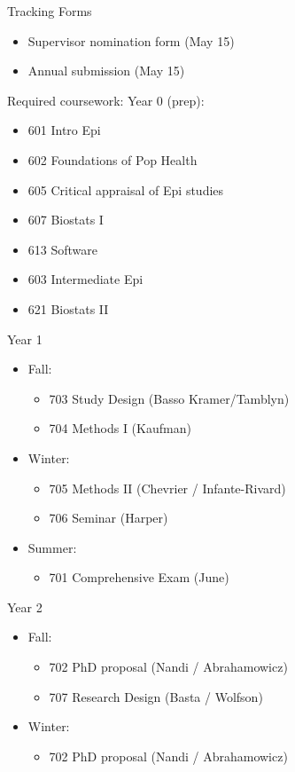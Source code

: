 \documentclass[
]{book}
\providecommand{\tightlist}{%
  \setlength{\itemsep}{0pt}\setlength{\parskip}{0pt}}
\begin{document}
Tracking Forms

\begin{itemize}
\tightlist
\item
  Supervisor nomination form (May 15)
\item
  Annual submission (May 15)
\end{itemize}

Required coursework:
Year 0 (prep):

\begin{itemize}
\tightlist
\item
  601 Intro Epi
\item
  602 Foundations of Pop Health
\item
  605 Critical appraisal of Epi studies
\item
  607 Biostats I
\item
  613 Software
\item
  603 Intermediate Epi
\item
  621 Biostats II
\end{itemize}

Year 1

\begin{itemize}
\tightlist
\item
  Fall:

  \begin{itemize}
  \tightlist
  \item
    703 Study Design (Basso Kramer/Tamblyn)
  \item
    704 Methods I (Kaufman)
  \end{itemize}
\item
  Winter:

  \begin{itemize}
  \tightlist
  \item
    705 Methods II (Chevrier / Infante-Rivard)
  \item
    706 Seminar (Harper)
  \end{itemize}
\item
  Summer:

  \begin{itemize}
  \tightlist
  \item
    701 Comprehensive Exam (June)
  \end{itemize}
\end{itemize}

Year 2

\begin{itemize}
\tightlist
\item
  Fall:

  \begin{itemize}
  \tightlist
  \item
    702 PhD proposal (Nandi / Abrahamowicz)
  \item
    707 Research Design (Basta / Wolfson)
  \end{itemize}
\item
  Winter:

  \begin{itemize}
  \tightlist
  \item
    702 PhD proposal (Nandi / Abrahamowicz)
  \end{itemize}
\end{itemize}
\end{document}
